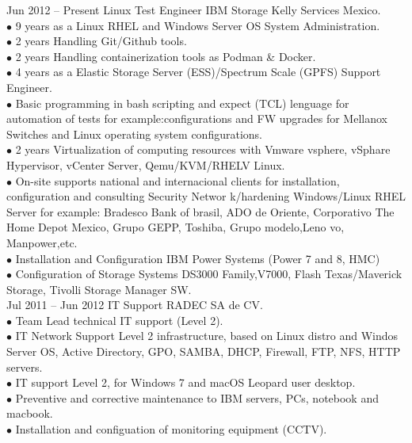 \documentclass[9pt]{developercv} %
\begin{document}

\begin{entrylist}
	\entry
		{Jun 2012 -- Present}
		{Linux Test Engineer IBM Storage}
		{Kelly Services Mexico.}
			{{}\\$\bullet$ 9 years as a Linux RHEL and Windows Server OS System Administration.
				\\$\bullet$ 2 years Handling Git/Github tools.			
				\\$\bullet$ 2 years Handling  containerization tools as Podman & Docker.			
				\\$\bullet$ 4 years as a Elastic Storage Server (ESS)/Spectrum Scale (GPFS) Support Engineer.
					\\$\bullet$ Basic programming in bash scripting and expect (TCL) lenguage for automation of tests for example:configurations and FW upgrades for Mellanox Switches and Linux operating system configurations.						
				\\$\bullet$ 2 years Virtualization of computing resources with Vmware vsphere, vSphare Hypervisor, vCenter Server, Qemu/KVM/RHELV Linux.
				\\$\bullet$ On-site supports national and internacional clients for installation, configuration and consulting Security Networ				                  k/hardening Windows/Linux RHEL Server for example:
					    Bradesco Bank of brasil, ADO de Oriente, Corporativo The Home Depot Mexico, Grupo GEPP, Toshiba, Grupo modelo,Leno						  vo, Manpower,etc.
				\\$\bullet$ Installation and Configuration IBM Power Systems (Power 7 and 8, HMC)
				\\$\bullet$ Configuration of Storage Systems DS3000 Family,V7000, Flash Texas/Maverick Storage, Tivolli Storage Manager SW.\\}
	\entry
	{Jul 2011 -- Jun 2012}
	{IT Support}
	{RADEC SA de CV.}
	{{} \\$\bullet$ Team Lead technical IT support (Level 2). 
		\\$\bullet$ IT Network Support Level 2 infrastructure, based
		on Linux distro and Windos Server OS, Active Directory, GPO, SAMBA, DHCP, Firewall, FTP,
		NFS, HTTP servers.
		\\$\bullet$ IT support Level 2, for Windows 7 and macOS Leopard user desktop.
		\\$\bullet$ Preventive and corrective maintenance to IBM servers, PCs, notebook and macbook.\\$\bullet$ Installation and configuation of monitoring equipment (CCTV).\\}

\end{entrylist}
\end{document}
